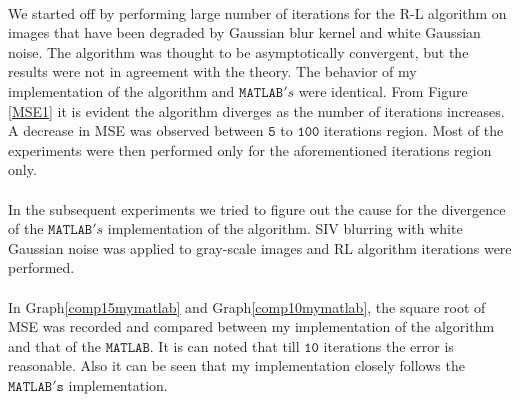 \documentclass[a4paper]{book}
\begin{document}
\paragraph*{} We started off by performing large number of iterations for the R-L algorithm on images that have been degraded by Gaussian blur kernel and white Gaussian noise. The algorithm was thought to be asymptotically convergent, but the results were not in agreement with the theory. The behavior of my implementation of the algorithm and $ \mathtt{MATLAB}'s $ were identical. From Figure \ref{MSE1} it is evident the algorithm diverges as the number of iterations increases. A decrease in MSE was observed between $\mathtt{5}$ to $\mathtt{100}$ iterations region. Most of the experiments were then performed only for the aforementioned iterations region only.

%

\paragraph*{} In the subsequent experiments we tried to figure out the cause for the divergence of the $ \mathtt{MATLAB}'s $ implementation of the algorithm. SIV blurring with white Gaussian noise was applied to gray-scale images and RL algorithm iterations were performed. 
\paragraph*{} In Graph\ref{comp15mymatlab} and Graph\ref{comp10mymatlab}, the square root of MSE was recorded and compared between my implementation of the algorithm and that of the $ \mathtt{MATLAB} $. It is can noted that till $ \mathtt{10} $ iterations the error is reasonable. Also it can be seen that my implementation closely follows the $ \mathtt{MATLAB's} $ implementation.
\end{document}
